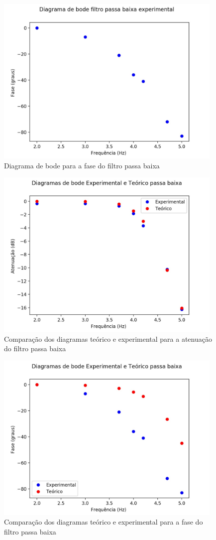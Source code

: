 \documentclass{article}
\begin{document}
\begin{figure}[h!]
\centering
\includegraphics[height=8.2cm]{images/passa_baixa_fase_exp.jpg}
\caption{Diagrama de bode para a fase do filtro passa baixa}
\label{fig:passa_baixa_fase}
\end{figure}

\begin{figure}[h!]
\centering
\includegraphics[height=8.2cm]{images/passa_baixa_ate_ambos.jpg}
\caption{Comparação dos diagramas teórico e experimental para a atenuação do filtro passa baixa}
\label{fig:passa_baixa_atenucao_ambos}
\end{figure}

\begin{figure}[h!]
\centering
\includegraphics[height=8.2cm]{images/passa_baixa_fase_ambos.jpg}
\caption{Comparação dos diagramas teórico e experimental para a fase do filtro passa baixa}
\label{fig:passa_baixa_fase_ambos}
\end{figure}
\end{document}
